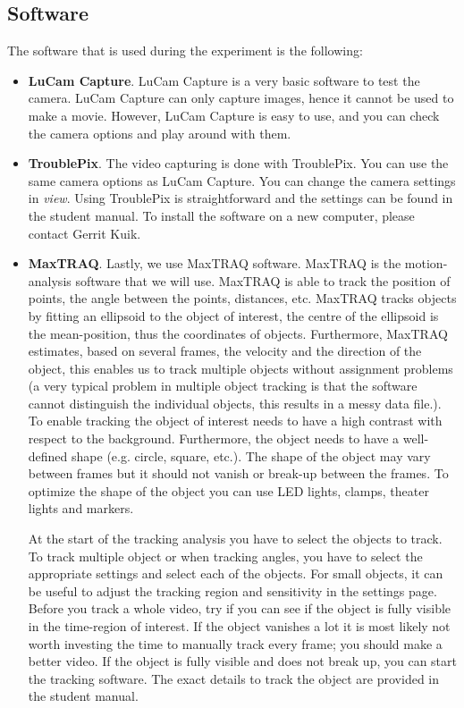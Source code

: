 \documentclass{article}
\begin{document}
\subsection{Software}
The software that is used during the experiment is the following:
\begin{itemize}
\item \textbf{LuCam Capture}. LuCam Capture is a very basic software to test the camera. LuCam Capture can only capture images, hence it cannot be used to make a movie. However, LuCam Capture is easy to use, and you can check the camera options and play around with them.
\item \textbf{TroublePix}. The video capturing is done with TroublePix. You can use the same camera options as LuCam Capture. You can change the camera settings in \emph{view}. Using TroublePix is straightforward and the settings can be found in the student manual.
To install the software on a new computer, please contact Gerrit Kuik. 
\item \textbf{MaxTRAQ}. Lastly, we use MaxTRAQ software. MaxTRAQ is the motion-analysis software that we will use. MaxTRAQ is able to track the position of points, the angle between the points, distances, etc. MaxTRAQ tracks objects by fitting an ellipsoid to the object of interest, the centre of the ellipsoid is the mean-position, thus the coordinates of objects. Furthermore, MaxTRAQ estimates, based on several frames, the velocity and the direction of the object, this enables us to track multiple objects without assignment problems (a very typical problem in multiple object tracking is that the software cannot distinguish the individual objects, this results in a messy data file.). To enable tracking the object of interest needs to have a high contrast with respect to the background. Furthermore, the object needs to have a well-defined shape (e.g. circle, square, etc.). The shape of the object may vary between frames but it should not vanish or break-up between the frames. To optimize the shape of the object you can use LED lights, clamps, theater lights and markers.

At the start of the tracking analysis you have to select the objects to track. To track multiple object or when tracking angles, you have to select the appropriate settings and select each of the objects. For small objects, it can be useful to adjust the tracking region and sensitivity in the settings page. Before you track a whole video, try if you can see if the object is fully visible in the time-region of interest. If the object vanishes a lot it is most likely not worth investing the time to manually track every frame; you should make a better video. If the object is fully visible and does not break up, you can start the tracking software. The exact details to track the object are provided in the student manual. 


\end{itemize}
\end{document}
